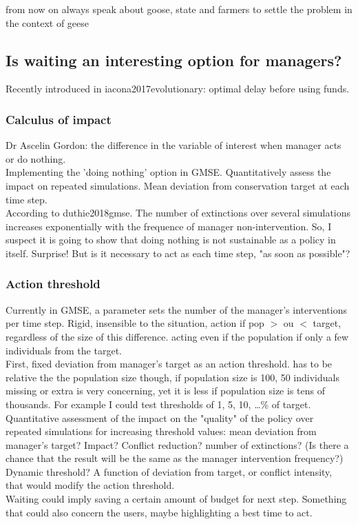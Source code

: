 \documentclass[12pt,a4paper]{article}
\begin{document}
from now on always speak about goose, state and farmers to settle the problem in the context of geese

\subsection{Is waiting an interesting option for managers?}

Recently introduced in iacona2017evolutionary: optimal delay before using funds.

\subsubsection{Calculus of impact}
Dr Ascelin Gordon: the difference in the variable of interest when manager acts or do nothing.\\
Implementing the 'doing nothing' option in GMSE. Quantitatively assess the impact on repeated simulations. Mean deviation from conservation target at each time step.\\
According to duthie2018gmse. The number of extinctions over several simulations increases exponentially with the frequence of manager non-intervention. So, I suspect it is going to show that doing nothing is not sustainable as a policy in itself. Surprise!
But is it necessary to act as each time step, "as soon as possible"?

\subsubsection{Action threshold}
Currently in GMSE, a parameter sets the number of the manager's interventions per time step. Rigid, insensible to the situation, action if pop $>$ ou $<$ target, regardless of the size of this difference. acting even if the population if only a few individuals from the target.\\
First, fixed deviation from manager's target as an action threshold. has to be relative the the population size though, if population size is 100, 50 individuals missing or extra is very concerning, yet it is less if population size is tens of thousands. For example I could test thresholds of 1, 5, 10, \dots \% of target.\\ 
Quantitative assessment of the impact on the "quality" of the policy over repeated simulations for increasing threshold values: mean deviation from manager's target? Impact? Conflict reduction? number of extinctions? (Is there a chance that the result will be the same as the manager intervention frequency?)\\
Dynamic threshold? A function of deviation from target, or conflict intensity, that would modify the action threshold.\\
Waiting could imply saving a certain amount of budget for next step. Something that could also concern the users, maybe highlighting a best time to act.
\end{document}

